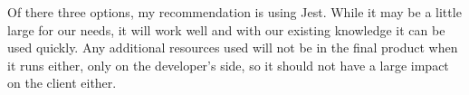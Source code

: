 \documentclass[draftclsnofoot,onecolumn,10pt]{IEEEtran}
\begin{document}
    \indent Of there three options, my recommendation is using Jest. While it may be a little large for our needs, it will work well and with our existing knowledge it can be used quickly. Any additional resources used will not be in the final product when it runs either, only on the developer's side, so it should not have a large impact on the client either.
    
    
\end{document}
